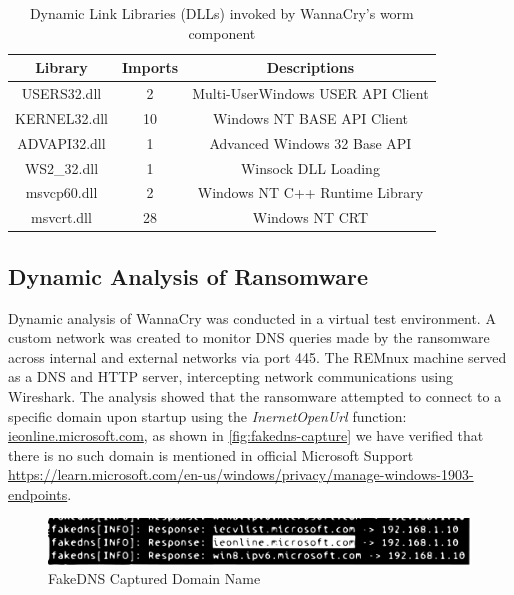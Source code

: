 \documentclass[12pt,letterpaper]{article}
\begin{document}
        \begin{table}[ht]
            \centering
            \caption{Dynamic Link Libraries (DLLs) invoked by WannaCry's worm component}
            \label{tab:DLL-Link1 File}
            \begin{tabular}{ccc}
                \toprule
                \textbf{Library} & \textbf{Imports} & \textbf{Descriptions} \\
                \midrule
                USERS32.dll & 2& Multi-UserWindows USER API Client\\
                KERNEL32.dll & 10& Windows NT BASE API Client\\
                ADVAPI32.dll & 1& Advanced Windows 32 Base API\\
                WS2\_32.dll & 1& Winsock DLL Loading\\
                msvcp60.dll & 2 &  Windows NT C++ Runtime Library \\
                msvcrt.dll & 28 & Windows NT CRT \\
                \bottomrule
            \end{tabular}
        \end{table}


    \subsection{Dynamic Analysis of Ransomware}


    Dynamic analysis of WannaCry was conducted in a virtual test environment. A custom network was created to monitor DNS queries made by the ransomware across internal and external networks via port 445. The REMnux machine served as a DNS and HTTP server, intercepting network communications using Wireshark. The analysis showed that the ransomware attempted to connect to a specific domain upon startup using the \textit{InernetOpenUrl} function: \url{ieonline.microsoft.com}, as shown in \autoref{fig:fakedns-capture} we have verified that there is no such domain is mentioned in official Microsoft Support \url{https://learn.microsoft.com/en-us/windows/privacy/manage-windows-1903-endpoints}.

    \begin{figure}[hbtt]
        \centering
        \includegraphics[width= \textwidth]{images/urlfakedns.pdf}
        \caption{FakeDNS Captured Domain Name}
        \label{fig:fakedns-capture}
    \end{figure}
\end{document}
